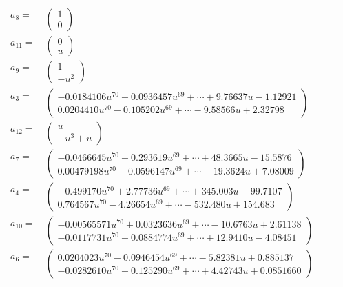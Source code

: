 \documentclass[1p]{elsarticle_modified}
\theoremstyle{definition}
\begin{document}
\begin{tabular}{m{7pt} m{180pt} m{7pt} m{180pt} }
\flushright $a_{8}=$&$\begin{pmatrix}1\\0\end{pmatrix}$ \\
\flushright $a_{11}=$&$\begin{pmatrix}0\\u\end{pmatrix}$ \\
\flushright $a_{9}=$&$\begin{pmatrix}1\\- u^2\end{pmatrix}$ \\
\flushright $a_{3}=$&$\begin{pmatrix}-0.0184106 u^{70}+0.0936457 u^{69}+\cdots+9.76637 u-1.12921\\0.0204410 u^{70}-0.105202 u^{69}+\cdots-9.58566 u+2.32798\end{pmatrix}$ \\
\flushright $a_{12}=$&$\begin{pmatrix}u\\- u^3+u\end{pmatrix}$ \\
\flushright $a_{7}=$&$\begin{pmatrix}-0.0466645 u^{70}+0.293619 u^{69}+\cdots+48.3665 u-15.5876\\0.00479198 u^{70}-0.0596147 u^{69}+\cdots-19.3624 u+7.08009\end{pmatrix}$ \\
\flushright $a_{4}=$&$\begin{pmatrix}-0.499170 u^{70}+2.77736 u^{69}+\cdots+345.003 u-99.7107\\0.764567 u^{70}-4.26654 u^{69}+\cdots-532.480 u+154.683\end{pmatrix}$ \\
\flushright $a_{10}=$&$\begin{pmatrix}-0.00565571 u^{70}+0.0323636 u^{69}+\cdots-10.6763 u+2.61138\\-0.0117731 u^{70}+0.0884774 u^{69}+\cdots+12.9410 u-4.08451\end{pmatrix}$ \\
\flushright $a_{6}=$&$\begin{pmatrix}0.0204023 u^{70}-0.0946454 u^{69}+\cdots-5.82381 u+0.885137\\-0.0282610 u^{70}+0.125290 u^{69}+\cdots+4.42743 u+0.0851660\end{pmatrix}$ \\

\end{tabular}
\end{document}
